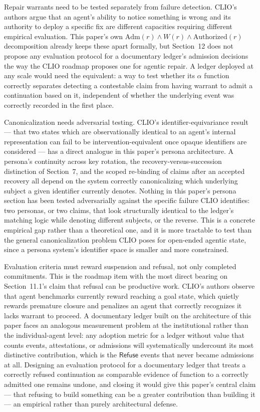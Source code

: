 \documentclass[11pt,oneside]{article}
\theoremstyle{plain}
\theoremstyle{definition}
\begin{document}
Repair warrants need to be tested separately from failure detection. CLIO's authors argue that an agent's ability to notice something is wrong and its authority to deploy a specific fix are different capacities requiring different empirical evaluation. This paper's own $\mathrm{Adm}(r) \land W(r) \land \mathrm{Authorized}(r)$ decomposition already keeps these apart formally, but Section~12 does not propose any evaluation protocol for a documentary ledger's admission decisions the way the CLIO roadmap proposes one for agentic repair. A ledger deployed at any scale would need the equivalent: a way to test whether its $\alpha$ function correctly separates detecting a contestable claim from having warrant to admit a continuation based on it, independent of whether the underlying event was correctly recorded in the first place.

Canonicalization needs adversarial testing. CLIO's identifier-equivariance result --- that two states which are observationally identical to an agent's internal representation can fail to be intervention-equivalent once opaque identifiers are considered --- has a direct analogue in this paper's persona architecture. A persona's continuity across key rotation, the recovery-versus-succession distinction of Section~7, and the scoped re-binding of claims after an accepted recovery all depend on the system correctly canonicalizing which underlying subject a given identifier currently denotes. Nothing in this paper's persona section has been tested adversarially against the specific failure CLIO identifies: two personas, or two claims, that look structurally identical to the ledger's matching logic while denoting different subjects, or the reverse. This is a concrete empirical gap rather than a theoretical one, and it is more tractable to test than the general canonicalization problem CLIO poses for open-ended agentic state, since a persona system's identifier space is smaller and more constrained.

Evaluation criteria must reward suspension and refusal, not only completed commitments. This is the roadmap item with the most direct bearing on Section~11.1's claim that refusal can be productive work. CLIO's authors observe that agent benchmarks currently reward reaching a goal state, which quietly rewards premature closure and penalizes an agent that correctly recognizes it lacks warrant to proceed. A documentary ledger built on the architecture of this paper faces an analogous measurement problem at the institutional rather than the individual-agent level: any adoption metric for a ledger without value that counts events, attestations, or admissions will systematically undercount its most distinctive contribution, which is the $\mathsf{Refuse}$ events that never became admissions at all. Designing an evaluation protocol for a documentary ledger that treats a correctly refused continuation as comparable evidence of function to a correctly admitted one remains undone, and closing it would give this paper's central claim --- that refusing to build something can be a greater contribution than building it --- an empirical rather than purely architectural defense.
\end{document}
